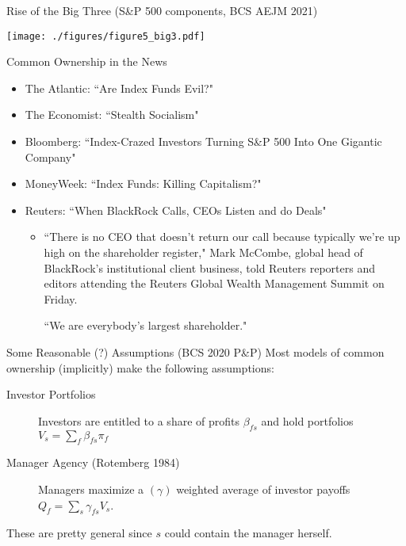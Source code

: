 \begin{frame}[plain]{Rise of the Big Three (S\&P 500 components, BCS AEJM 2021)}
\begin{center}
\texttt{[image: ./figures/figure5\_big3.pdf]}
\end{center}
\end{frame}

\begin{frame}[plain]{Common Ownership in the News}
\begin{itemize}
\item The Atlantic: ``Are Index Funds Evil?"
\item The Economist: ``Stealth Socialism"
\item Bloomberg: ``Index-Crazed Investors Turning S\&P 500 Into One Gigantic Company"
\item MoneyWeek: ``Index Funds: Killing Capitalism?"
\item Reuters: ``When BlackRock Calls, CEOs Listen and do Deals"
\pause
\begin{itemize}
\item ``There is no CEO that doesn't return our call because typically we're up high on the shareholder register," Mark McCombe, global head of BlackRock's institutional client business, told Reuters reporters and editors attending the Reuters Global Wealth Management Summit on Friday.

``We are everybody's largest shareholder."
\end{itemize}
\end{itemize}
\end{frame}


\begin{frame}{Some Reasonable (?) Assumptions (BCS 2020 P\&P)}
Most models of common ownership (implicitly) make the following assumptions:
\begin{description}
\item[Investor Portfolios] Investors are entitled to a share of profits $\beta_{fs}$ and hold portfolios $V_s = \sum_{f} \beta_{fs} \pi_f$
\pause
\item[Manager Agency (Rotemberg 1984)] Managers maximize a $(\gamma)$ weighted average of investor payoffs $Q_f = \sum_{s} \gamma_{fs} V_s$.
\end{description}
These are pretty general since $s$ could contain the manager herself.\\
\end{frame}

